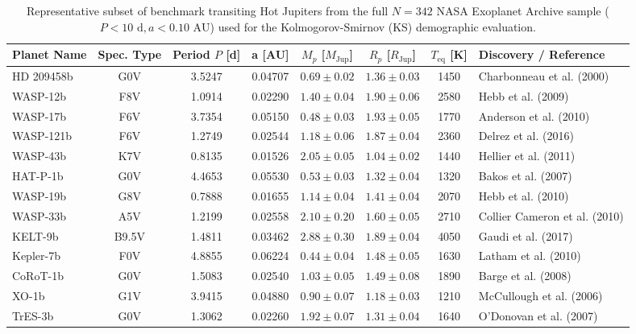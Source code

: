 \begin{table}[t!]
\centering
\caption{Representative subset of benchmark transiting Hot Jupiters from the full $N = 342$ NASA Exoplanet Archive sample ($P < 10\text{ d}, a < 0.10\text{ AU}$) used for the Kolmogorov-Smirnov (KS) demographic evaluation.}
\label{tab:observational_sample}
\small
\begin{tabular}{l c c c c c c l}
\toprule
\textbf{Planet Name} & \textbf{Spec. Type} & \textbf{Period $P$ [d]} & \textbf{a [AU]} & \textbf{$M_p$ [$M_{\mathrm{Jup}}$]} & \textbf{$R_p$ [$R_{\mathrm{Jup}}$]} & \textbf{$T_{\mathrm{eq}}$ [K]} & \textbf{Discovery / Reference} \\
\midrule
HD 209458b  & G0V & 3.5247 & 0.04707 & $0.69 \pm 0.02$ & $1.36 \pm 0.03$ & 1450 & Charbonneau et al. (2000) \\
WASP-12b    & F8V & 1.0914 & 0.02290 & $1.40 \pm 0.04$ & $1.90 \pm 0.06$ & 2580 & Hebb et al. (2009) \\
WASP-17b    & F6V & 3.7354 & 0.05150 & $0.48 \pm 0.03$ & $1.93 \pm 0.05$ & 1770 & Anderson et al. (2010) \\
WASP-121b   & F6V & 1.2749 & 0.02544 & $1.18 \pm 0.06$ & $1.87 \pm 0.04$ & 2360 & Delrez et al. (2016) \\
WASP-43b    & K7V & 0.8135 & 0.01526 & $2.05 \pm 0.05$ & $1.04 \pm 0.02$ & 1440 & Hellier et al. (2011) \\
HAT-P-1b    & G0V & 4.4653 & 0.05530 & $0.53 \pm 0.03$ & $1.32 \pm 0.04$ & 1320 & Bakos et al. (2007) \\
WASP-19b    & G8V & 0.7888 & 0.01655 & $1.14 \pm 0.04$ & $1.41 \pm 0.04$ & 2070 & Hebb et al. (2010) \\
WASP-33b    & A5V & 1.2199 & 0.02558 & $2.10 \pm 0.20$ & $1.60 \pm 0.05$ & 2710 & Collier Cameron et al. (2010) \\
KELT-9b     & B9.5V & 1.4811 & 0.03462 & $2.88 \pm 0.30$ & $1.89 \pm 0.04$ & 4050 & Gaudi et al. (2017) \\
Kepler-7b   & F0V & 4.8855 & 0.06224 & $0.44 \pm 0.04$ & $1.48 \pm 0.05$ & 1630 & Latham et al. (2010) \\
CoRoT-1b    & G0V & 1.5083 & 0.02540 & $1.03 \pm 0.05$ & $1.49 \pm 0.08$ & 1890 & Barge et al. (2008) \\
XO-1b       & G1V & 3.9415 & 0.04880 & $0.90 \pm 0.07$ & $1.18 \pm 0.03$ & 1210 & McCullough et al. (2006) \\
TrES-3b     & G0V & 1.3062 & 0.02260 & $1.92 \pm 0.07$ & $1.31 \pm 0.04$ & 1640 & O'Donovan et al. (2007) \\

\end{tabular}
\end{table}
